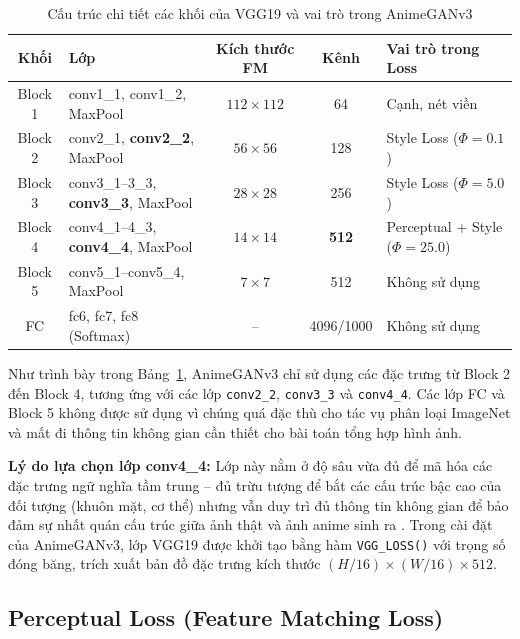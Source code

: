 \begin{table}[H]
\caption{Cấu trúc chi tiết các khối của VGG19 và vai trò trong AnimeGANv3}
\label{tab:vgg19_blocks}
\centering
\begin{tabular}{|c|p{4.5cm}|c|c|p{3.5cm}|}
\hline
\textbf{Khối} & \textbf{Lớp} & \textbf{Kích thước FM} & \textbf{Kênh} & \textbf{Vai trò trong Loss} \\
\hline
Block 1 & conv1\_1, conv1\_2, MaxPool & $112{\times}112$ & 64 & Cạnh, nét viền \\
\hline
Block 2 & conv2\_1, \textbf{conv2\_2}, MaxPool & $56{\times}56$ & 128 & Style Loss ($\Phi=0.1$) \\
\hline
Block 3 & conv3\_1--3\_3, \textbf{conv3\_3}, MaxPool & $28{\times}28$ & 256 & Style Loss ($\Phi=5.0$) \\
\hline
Block 4 & conv4\_1--4\_3, \textbf{conv4\_4}, MaxPool & $14{\times}14$ & \textbf{512} & Perceptual + Style ($\Phi=25.0$) \\
\hline
Block 5 & conv5\_1--conv5\_4, MaxPool & $7{\times}7$ & 512 & Không sử dụng \\
\hline
FC & fc6, fc7, fc8 (Softmax) & -- & 4096/1000 & Không sử dụng \\
\hline
\end{tabular}
\end{table}

Như trình bày trong Bảng~\ref{tab:vgg19_blocks}, AnimeGANv3 chỉ sử dụng các đặc trưng từ
Block 2 đến Block 4, tương ứng với các lớp \texttt{conv2\_2}, \texttt{conv3\_3} và
\texttt{conv4\_4}. Các lớp FC và Block 5 không được sử dụng vì chúng quá đặc thù cho tác
vụ phân loại ImageNet và mất đi thông tin không gian cần thiết cho bài toán tổng hợp hình ảnh.

\textbf{Lý do lựa chọn lớp conv4\_4:} Lớp này nằm ở độ sâu vừa đủ để mã hóa các đặc trưng
ngữ nghĩa tầm trung -- đủ trừu tượng để bắt các cấu trúc bậc cao của đối tượng (khuôn mặt,
cơ thể) nhưng vẫn duy trì đủ thông tin không gian để bảo đảm sự nhất quán cấu trúc giữa ảnh
thật và ảnh anime sinh ra \cite{Johnson2016}. Trong cài đặt của AnimeGANv3, lớp VGG19 được
khởi tạo bằng hàm \texttt{VGG\_LOSS()} với trọng số đóng băng, trích xuất bản đồ đặc trưng
kích thước $(H/16) \times (W/16) \times 512$.

\subsection{Perceptual Loss (Feature Matching Loss)}
\label{subsec:perceptual_loss}

